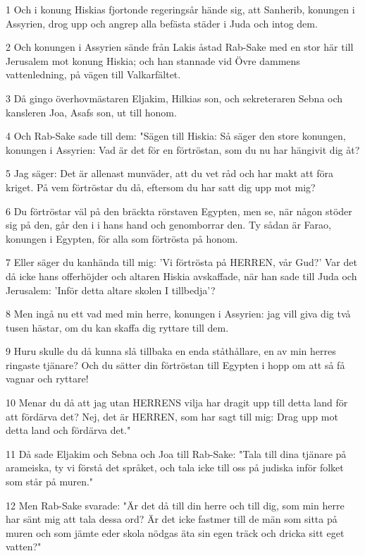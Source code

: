 \par 1 Och i konung Hiskias fjortonde regeringsår hände sig, att Sanherib, konungen i Assyrien, drog upp och angrep alla befästa städer i Juda och intog dem.
\par 2 Och konungen i Assyrien sände från Lakis åstad Rab-Sake med en stor här till Jerusalem mot konung Hiskia; och han stannade vid Övre dammens vattenledning, på vägen till Valkarfältet.
\par 3 Då gingo överhovmästaren Eljakim, Hilkias son, och sekreteraren Sebna och kansleren Joa, Asafs son, ut till honom.
\par 4 Och Rab-Sake sade till dem: "Sägen till Hiskia: Så säger den store konungen, konungen i Assyrien: Vad är det för en förtröstan, som du nu har hängivit dig åt?
\par 5 Jag säger: Det är allenast munväder, att du vet råd och har makt att föra kriget. På vem förtröstar du då, eftersom du har satt dig upp mot mig?
\par 6 Du förtröstar väl på den bräckta rörstaven Egypten, men se, när någon stöder sig på den, går den i i hans hand och genomborrar den. Ty sådan är Farao, konungen i Egypten, för alla som förtrösta på honom.
\par 7 Eller säger du kanhända till mig: 'Vi förtrösta på HERREN, vår Gud?' Var det då icke hans offerhöjder och altaren Hiskia avskaffade, när han sade till Juda och Jerusalem: 'Inför detta altare skolen I tillbedja'?
\par 8 Men ingå nu ett vad med min herre, konungen i Assyrien: jag vill giva dig två tusen hästar, om du kan skaffa dig ryttare till dem.
\par 9 Huru skulle du då kunna slå tillbaka en enda ståthållare, en av min herres ringaste tjänare? Och du sätter din förtröstan till Egypten i hopp om att så få vagnar och ryttare!
\par 10 Menar du då att jag utan HERRENS vilja har dragit upp till detta land för att fördärva det? Nej, det är HERREN, som har sagt till mig: Drag upp mot detta land och fördärva det."
\par 11 Då sade Eljakim och Sebna och Joa till Rab-Sake: "Tala till dina tjänare på arameiska, ty vi förstå det språket, och tala icke till oss på judiska inför folket som står på muren."
\par 12 Men Rab-Sake svarade: "Är det då till din herre och till dig, som min herre har sänt mig att tala dessa ord? Är det icke fastmer till de män som sitta på muren och som jämte eder skola nödgas äta sin egen träck och dricka sitt eget vatten?"
